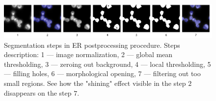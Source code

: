 \begin{figure}[htb]
    \begin{center}
        \includegraphics[width=\linewidth]{bilder/ER/segmentation/segmentation.png}
        \caption[Segmentation steps in ER postprocessing procedure]%
        {Segmentation steps in ER postprocessing procedure. Steps description: 1 --- image normalization, 2 --- global mean thresholding, 3 --- zeroing out background, 4 --- local thresholding, 5 --- filling holes, 6 --- morphological opening, 7 --- filtering out too small regions. See how the "shining" effect visible in the step $2$ disappears on the step $7$.}\label{fig:er-segmentation-steps}
    \end{center}
\end{figure}